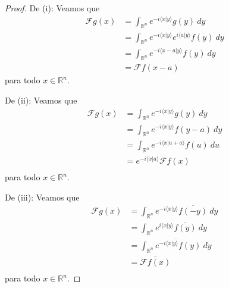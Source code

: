 \documentclass[12pt]{report}
\theoremstyle{largebreak}
\newcommand\pint[2]{\ensuremath{\langle#1| #2\rangle}}
\newcommand\conj[1]{\ensuremath{\overline{#1}}}
\newcommand{\fou}[1]{\ensuremath{\mathcal{F}#1}}
\begin{document}
    \begin{proof}
        De (i): Veamos que
        \begin{equation*}
            \begin{split}
                \fou{g}(x)&=\int_{\mathbb{R}^n}e^{ -i\pint{x}{y}}g(y)\:dy\\
                &=\int_{\mathbb{R}^n}e^{ -i\pint{x}{y}}e^{ i\pint{a}{y}}f(y)\:dy\\
                &=\int_{\mathbb{R}^n}e^{ -i\pint{x-a}{y}}f(y)\:dy\\
                &=\fou{f}(x-a)
            \end{split}
        \end{equation*}
        para todo $x\in\mathbb{R}^n$.

        De (ii): Veamos que
        \begin{equation*}
            \begin{split}
                \fou{g}(x)&=\int_{\mathbb{R}^n}e^{ -i\pint{x}{y}}g(y)\:dy\\
                &=\int_{\mathbb{R}^n}e^{ -i\pint{x}{y}}f(y-a)\:dy\\
                &=\int_{\mathbb{R}^n}e^{ -i\pint{x}{u+a}}f(u)\:du\\
                &=e^{ -i\pint{x}{a}}\fou{f}(x) \\
            \end{split}
        \end{equation*}
        para todo $x\in\mathbb{R}^n$.

        De (iii): Veamos que
        \begin{equation*}
            \begin{split}
                \fou{g}(x)&=\int_{\mathbb{R}^n}e^{-i\pint{x}{y}}\conj{f(-y)}\:dy\\
                &=\int_{\mathbb{R}^n}e^{i\pint{x}{y}}\conj{f(y)}\:dy\\
                &=\conj{\int_{\mathbb{R}^n}e^{-i\pint{x}{y}}f(y)\:dy}\\
                &=\conj{\fou{f}(x)}\\
            \end{split}
        \end{equation*}
        para todo $x\in\mathbb{R}^n$.
        

\end{proof}
\end{document}
